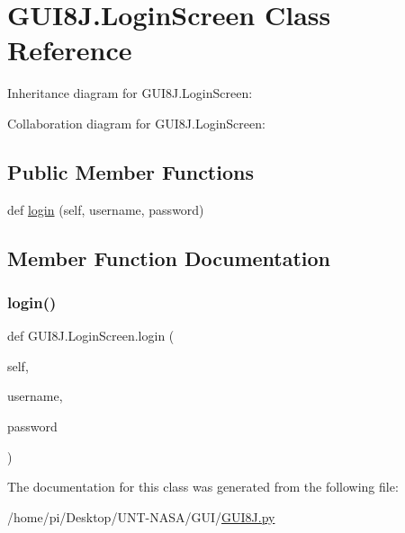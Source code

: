 \hypertarget{classGUI8J_1_1LoginScreen}{}\section{G\+U\+I8\+J.\+Login\+Screen Class Reference}
\label{classGUI8J_1_1LoginScreen}


Inheritance diagram for G\+U\+I8\+J.\+Login\+Screen\+:


Collaboration diagram for G\+U\+I8\+J.\+Login\+Screen\+:
\subsection*{Public Member Functions}
\begin{DoxyCompactItemize}
\item 
def \hyperlink{classGUI8J_1_1LoginScreen_adeed689e5c760bced0580e28839f5dc7}{login} (self, username, password)
\end{DoxyCompactItemize}


\subsection{Member Function Documentation}
\mbox{\label{classGUI8J_1_1LoginScreen_adeed689e5c760bced0580e28839f5dc7}} 
\subsubsection{\texorpdfstring{login()}{login()}}
{\footnotesize\ttfamily def G\+U\+I8\+J.\+Login\+Screen.\+login (\begin{DoxyParamCaption}\item[{}]{self,  }\item[{}]{username,  }\item[{}]{password }\end{DoxyParamCaption})}



The documentation for this class was generated from the following file\+:\begin{DoxyCompactItemize}
\item 
/home/pi/\+Desktop/\+U\+N\+T-\/\+N\+A\+S\+A/\+G\+U\+I/\hyperlink{GUI8J_8py}{G\+U\+I8\+J.\+py}\end{DoxyCompactItemize}
